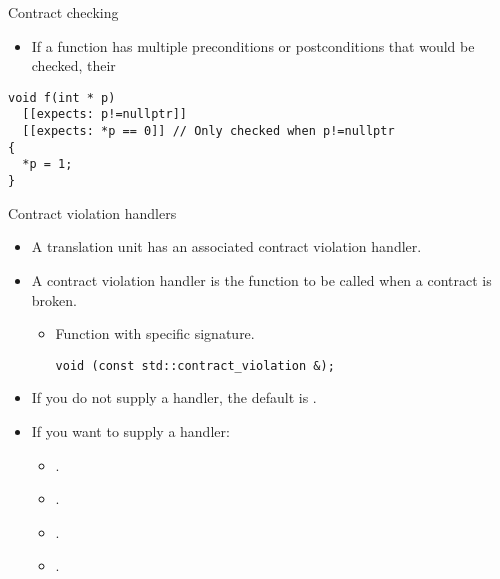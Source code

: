 \begin{frame}[t,fragile]{Contract checking}
\begin{itemize}
\item If a function has multiple preconditions or postconditions
that would be checked, their 
\end{itemize}

\vfill\pause
\begin{lstlisting}
void f(int * p)
  [[expects: p!=nullptr]]
  [[expects: *p == 0]] // Only checked when p!=nullptr
{
  *p = 1;
}
\end{lstlisting}
\end{frame}

\begin{frame}[t,fragile]{Contract violation handlers}
\begin{itemize}
  \item A translation unit has an associated contract violation handler.

  \vfill\pause
  \item A contract violation handler is the function to be called when a
contract is broken.
    \begin{itemize}
      \item Function with specific signature.
\begin{lstlisting}
void (const std::contract_violation &);
\end{lstlisting}
    \end{itemize}

  \vfill\pause
  \item If you do not supply a handler, the default is .

  \vfill\pause
  \item If you want to supply a handler:
    \pause
    \begin{itemize}[<+->]
      \item {}.
      \item {}.
      \item {}.
      \item {}.
    \end{itemize}

\end{itemize}
\end{frame}

